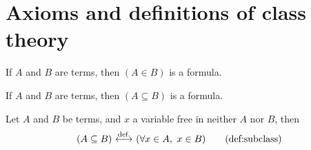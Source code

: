 \section{Axioms and definitions of class theory}\label{sec:axioms}
\begin{constructor}
If $A$ and $B$ are terms, then $(A\in B)$ is a formula. %
\end{constructor}



\begin{constructor}
If $A$ and $B$ are terms, then $(A\subseteq B)$ is a formula. %
\end{constructor}
\begin{definition}
Let $A$ and $B$ be terms, and $x$ a variable free in neither $A$ nor $B$, then
\[
(A\subseteq B)\iffdef(\forall x\in A,\ x\in B)
\labeltagd{def}{subclass}
\]
\end{definition}

